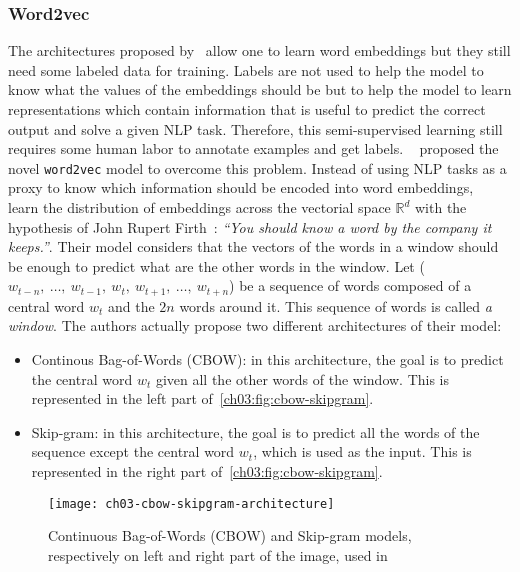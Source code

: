     \subsubsection{Word2vec}
      The architectures proposed by~\citeauthor{collobert2011natural}
      \citep{collobert2008unified, collobert2011natural} allow one to learn word
      embeddings but they still need some labeled data for training. Labels are
      not used to help the model to know what the values of the embeddings
      should be but to help the model to learn representations which contain
      information that is useful to predict the correct output and solve a given
      NLP task. Therefore, this semi-supervised learning still requires some
      human labor to annotate examples and get labels.
      \citeauthor{mikolov2013efficient}~\citep{mikolov2013efficient} proposed
      the novel \texttt{word2vec} model to overcome this problem. Instead of
      using NLP tasks as a proxy to know which information should be encoded
      into word embeddings,~\citeauthor{mikolov2013efficient} learn the
      distribution of embeddings across the vectorial space $\mathbb{R}^d$ with
      the hypothesis of John Rupert Firth~\citep{firth1961papers}: \textit{``You
      should know a word by the company it keeps.''}. Their model considers that
      the vectors of the words in a window should be enough to predict what are
      the other words in the window. Let ($w_{t-n}, ~\dots, ~w_{t-1}, ~w_t,
      ~w_{t+1}, ~\dots, ~w_{t+n}$) be a sequence of words composed of a central
      word $w_t$ and the $2n$ words around it. This sequence of words is called
      \textit{a window}. The authors actually propose two different
      architectures of their model:

      \begin{itemize}
        \item Continous Bag-of-Words (CBOW): in this architecture, the goal is
          to predict the central word $w_t$ given all the other words of the
          window. This is represented in the left part
          of~\autoref{ch03:fig:cbow-skipgram}.
        \item Skip-gram: in this architecture, the goal is to predict all the
          words of the sequence except the central word $w_t$, which is used as
          the input. This is represented in the right part
          of~\autoref{ch03:fig:cbow-skipgram}.
      \end{itemize}

      \begin{figure}[h!]
        \centering
        \texttt{[image: ch03-cbow-skipgram-architecture]}
        \caption[CBOW and Skip-gram model used
        by~\citeauthor{mikolov2013efficient}]{Continuous Bag-of-Words (CBOW) and
        Skip-gram models, respectively on left and right part of the image, used
        in~\citep{mikolov2013efficient}}
        \label{ch03:fig:cbow-skipgram}
      \end{figure}

